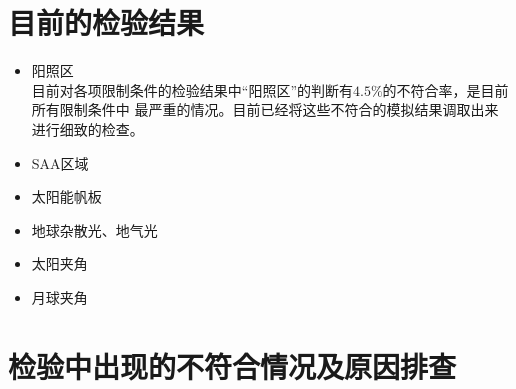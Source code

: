 \section{目前的检验结果}
\begin{itemize}
\item 阳照区\\
目前对各项限制条件的检验结果中“阳照区”的判断有$4.5\%$的不符合率，是目前所有限制条件中
最严重的情况。目前已经将这些不符合的模拟结果调取出来进行细致的检查。

\item SAA区域\\

\item 太阳能帆板\\


\item 地球杂散光、地气光\\




\item 太阳夹角\\


\item 月球夹角\\

\end{itemize}
\section{检验中出现的不符合情况及原因排查}
